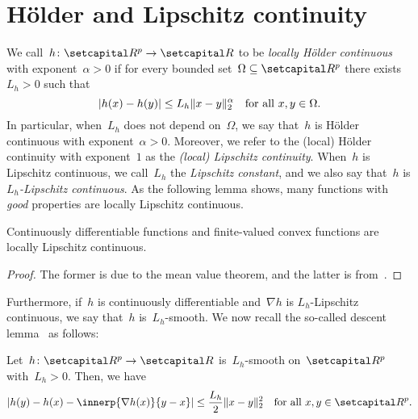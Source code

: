 \documentclass[../main]{subfiles}
\begin{document}
\section{H\"older and Lipschitz continuity}
We call~$h \colon \setR^p \to \setR$ to be \emph{locally H\"older continuous} with exponent~$\alpha > 0$ if for every bounded set~$\Omega \subseteq \setR^p$ there exists~$L_h > 0$ such that
\[
    \lvert h(x) - h(y)\rvert \le L_h \lVert x - y\rVert_2^\alpha \quad \text{for all~$x, y \in \Omega$}
.\] 
In particular, when~$L_h$ does not depend on~$\Omega$, we say that~$h$ is H\"older continuous with exponent~$\alpha > 0$.
Moreover, we refer to the (local) H\"older continuity with exponent~$1$ as the \emph{(local) Lipschitz continuity}.
When~$h$ is Lipschitz continuous, we call~$L_h$ the \emph{Lipschitz constant}, and we also say that~$h$ is \emph{$L_h$-Lipschitz continuous}.
As the following lemma shows, many functions with \emph{good} properties are locally Lipschitz continuous.
\begin{lemma} \label{thm:local_Lipschitz}
    Continuously differentiable functions and finite-valued convex functions are locally Lipschitz continuous.
\end{lemma}
\begin{proof}
    The former is due to the mean value theorem, and the latter is from~\cite{WayneStateUniversity1972}.
\end{proof}

Furthermore, if~$h$ is continuously differentiable and~$\nabla h$ is $L_h$-Lipschitz continuous, we say that~$h$ is~$L_h$-smooth.
We now recall the so-called descent lemma~\cite[Proposition A.24]{Bertsekas1999} as follows:
\begin{lemma} \label{thm:descent}
    Let~$h \colon \setR^p \to \setR$ is~$L_h$-smooth on~$\setR^p$ with~$L_h > 0$.
    Then, we have
    \[
        \abs{h(y) - h(x) - \innerp{\nabla h(x)}{y - x}} \le \frac{L_h}{2} \norm{x - y}_2^2 \forallcondition{x, y \in \setR^p}
    .\] 
\end{lemma}
\end{document}
